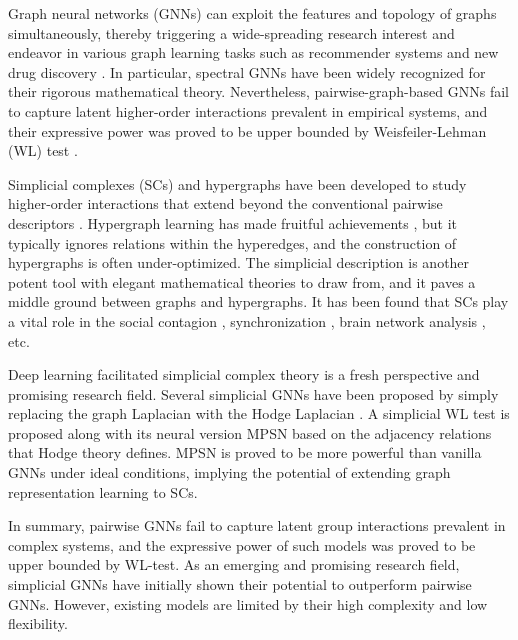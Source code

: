 \documentclass[letterpaper]{article} \usepackage{aaai24}
\theoremstyle{plain}
\theoremstyle{definition}
\theoremstyle{remark}
\begin{document}
Graph neural networks (GNNs) can exploit the features and topology of graphs simultaneously, thereby triggering a wide-spreading research interest and endeavor in various graph learning tasks such as recommender systems \cite{GNNRecomd22} and new drug discovery \cite{DrugGNN2018}.
In particular, spectral GNNs have been widely recognized for their rigorous mathematical theory.
Nevertheless, pairwise-graph-based GNNs fail to capture latent higher-order interactions prevalent in empirical systems, and their expressive power was proved to be upper bounded by Weisfeiler-Lehman (WL) test \cite{GIN2019}.


Simplicial complexes (SCs) and hypergraphs have been developed to study higher-order interactions that extend beyond the conventional pairwise descriptors \cite{HigherOrderReview2020}. 
Hypergraph learning has made fruitful achievements \cite{HypergraphLearning22review}, but it typically ignores relations within the hyperedges, and the construction of hypergraphs is often under-optimized.
The simplicial description is another potent tool with elegant mathematical theories to draw from, and it paves a middle ground between graphs and hypergraphs.
It has been found that SCs play a vital role in the social contagion \cite{battiston2021physics}, synchronization \cite{gambuzza2021stability}, brain network analysis \cite{Brain2018cliques}, etc.  


Deep learning facilitated simplicial complex theory is a fresh perspective and promising research field.
Several simplicial GNNs have been proposed by simply replacing the graph Laplacian with the Hodge Laplacian \cite{hodge_schaub2020random}. 
A simplicial WL test is proposed along with its neural version MPSN \cite{SWL2021} based on the adjacency relations that Hodge theory defines.
MPSN is proved to be more powerful than vanilla GNNs under ideal conditions, implying the potential of extending graph representation learning to SCs.


In summary, pairwise GNNs fail to capture latent group interactions prevalent in complex systems, and the expressive power of such models was proved to be upper bounded by WL-test. 
As an emerging and promising research field, simplicial GNNs have initially shown their potential to outperform pairwise GNNs. 
However, existing models are limited by their high complexity and low flexibility.
\end{document}
